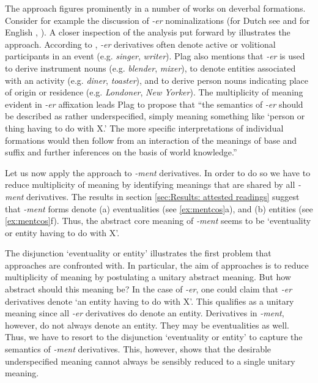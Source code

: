 \documentclass[output=paper]{langsci/langscibook}
\begin{document}
The  approach figures prominently in a number of works on deverbal formations. Consider for example the discussion of \textit{-er} nominalizations (for Dutch see \citealt{Booij.1986} and for English \citealt{Rappaport.1992}, \citealt{Plag.2003g}).  A closer inspection of the analysis put forward by \citet{Plag.2003g} illustrates the  approach. According to \citet[89]{Plag.2003g}, \textit{-er} derivatives often denote active or volitional participants in an event (e.g. \textit{singer}, \textit{writer}). Plag also mentions that \textit{-er} is used to derive instrument nouns (e.g. \textit{blender}, \textit{mixer}), to denote entities associated with an activity (e.g. \textit{diner}, \textit{toaster}), and to derive person nouns indicating place of origin or residence (e.g. \textit{Londoner}, \textit{New Yorker}). The multiplicity of meaning evident in \textit{-er} affixation leads Plag to propose that ``the semantics of \textit{-er} should be described as rather underspecified, simply meaning something like `person or thing having to do with X.' The more specific interpretations of individual formations would then follow from an interaction of the meanings of base and suffix and further inferences on the basis of world knowledge.'' \citep[89]{Plag.2003g}

Let us now apply the  approach to \textit{-ment} derivatives. In order to do so we have to reduce multiplicity of meaning by identifying meanings that are shared by all \textit{-ment} derivatives. The results in section \ref{sec:Results: attested readings} suggest that \textit{-ment} forms denote (a) eventualities (see \ref{ex:mentcos}a), and (b) entities (see \ref{ex:mentcos}f). Thus, the abstract core meaning of \textit{-ment} seems to be `eventuality or entity having to do with X'.

The disjunction `eventuality or entity' illustrates the first problem that  approaches are confronted with. In particular, the aim of  approaches is to reduce multiplicity of meaning by postulating a unitary abstract meaning. But how abstract should this meaning be?  In the case of \textit{-er}, one could claim that \textit{-er} derivatives denote `an entity having to do with X'. This qualifies as a unitary meaning since all \textit{-er} derivatives do denote an entity. Derivatives in \textit{-ment}, however, do not always denote an entity. They may be eventualities as well. Thus, we have to resort to the disjunction `eventuality or entity' to capture the semantics of \textit{-ment} derivatives. This, however, shows that the desirable underspecified meaning cannot always be sensibly reduced to a single unitary meaning.
\end{document}
